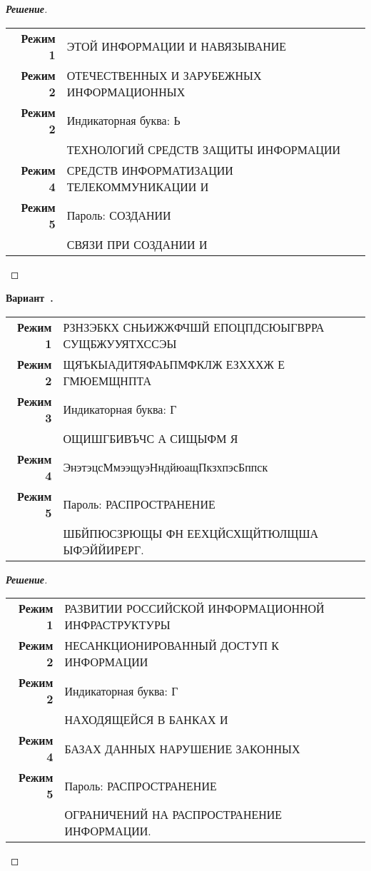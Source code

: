 \documentclass[a4paper,14pt]{extarticle}
\newcounter{exercise}[section]
\newenvironment{exercise}[1][]{\refstepcounter{exercise}\par\medskip
   \noindent\textbf{Вариант~\theexercise. #1}\\
   \noindent\makebox[\linewidth]{\rule{\textwidth}{1.25pt}}
   }
{\vspace{-2.5px}\mbox{}\newline \noindent\makebox[\linewidth]{\rule{\textwidth}{.5pt}}
}
\newenvironment{solution}
{\begin{proof}[\textbf{\textit{Решение}}]}
  {\end{proof}}
\begin{document}
\begin{solution}
\begin{table}[H]
	\centering
	\begin{tabular}{r l}\textbf{Режим 1}  & ЭТОЙ ИНФОРМАЦИИ И НАВЯЗЫВАНИЕ \\ 
\textbf{Режим 2}  & ОТЕЧЕСТВЕННЫХ И ЗАРУБЕЖНЫХ ИНФОРМАЦИОННЫХ \\ 
\textbf{Режим 2}  & Индикаторная буква: Ь \\ 
& ТЕХНОЛОГИЙ СРЕДСТВ ЗАЩИТЫ ИНФОРМАЦИИ \\ 
\textbf{Режим 4}  & СРЕДСТВ ИНФОРМАТИЗАЦИИ ТЕЛЕКОММУНИКАЦИИ И \\ 
\textbf{Режим 5}  & Пароль: СОЗДАНИИ \\ 
& СВЯЗИ ПРИ СОЗДАНИИ И \\ 
	\end{tabular} 
\end{table}

\end{solution}
\begin{exercise}\begin{table}[H]
	\centering
	\begin{tabular}{r l}\textbf{Режим 1}  & РЗНЗЭБКХ СНЬИЖЖФЧШЙ ЕПОЦПДСЮЫГВРРА СУЩБЖУУЯТХССЭЫ \\ 
\textbf{Режим 2}  & ЩЯЪКЫАДИТЯФАЬПМФКЛЖ ЕЗХХХЖ Е ГМЮЕМЩНПТА \\ 
\textbf{Режим 3}  & Индикаторная буква: Г \\ 
& ОЩИШГБИВЪЧС А СИЩЫФМ Я \\ 
\textbf{Режим 4}  & ЭнэтэцсМмээщуэНндйюащПкзхпэсБппск \\ 
\textbf{Режим 5}  & Пароль: РАСПРОСТРАНЕНИЕ \\ 
& ШБЙПЮСЗРЮЩЫ ФН ЕЕХЦЙСХЩЙТЮЛЩША ЫФЭЙЙИРЕРГ. \\ 
	\end{tabular} 
\end{table}

\end{exercise}
\begin{solution}
\begin{table}[H]
	\centering
	\begin{tabular}{r l}\textbf{Режим 1}  & РАЗВИТИИ РОССИЙСКОЙ ИНФОРМАЦИОННОЙ ИНФРАСТРУКТУРЫ \\ 
\textbf{Режим 2}  & НЕСАНКЦИОНИРОВАННЫЙ ДОСТУП К ИНФОРМАЦИИ \\ 
\textbf{Режим 2}  & Индикаторная буква: Г \\ 
& НАХОДЯЩЕЙСЯ В БАНКАХ И \\ 
\textbf{Режим 4}  & БАЗАХ ДАННЫХ НАРУШЕНИЕ ЗАКОННЫХ \\ 
\textbf{Режим 5}  & Пароль: РАСПРОСТРАНЕНИЕ \\ 
& ОГРАНИЧЕНИЙ НА РАСПРОСТРАНЕНИЕ ИНФОРМАЦИИ. \\ 
	\end{tabular} 
\end{table}

\end{solution}
\end{document}
